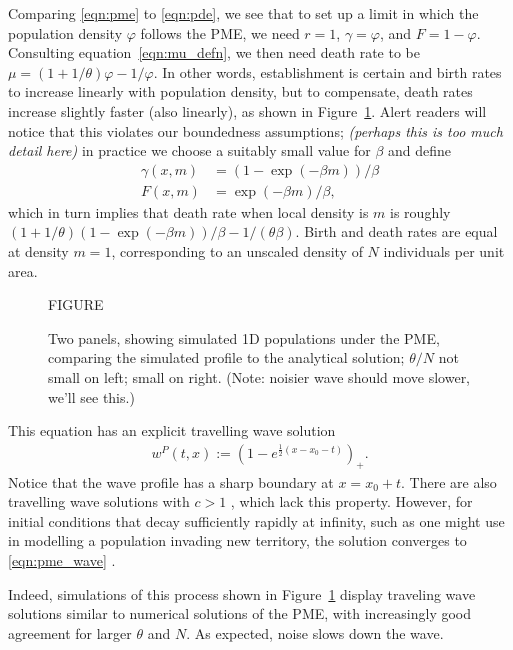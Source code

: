 \documentclass[12pt]{article}
\newcommand{\comment}[1]{{\color{blue} \it #1}}
\begin{document}
Comparing \eqref{eqn:pme} to \eqref{eqn:pde},
we see that to set up a limit in which the population density $\varphi$ follows the PME,
we need $r=1$,
$\gamma = \varphi$, and $F = 1 - \varphi$.
Consulting equation~\eqref{eqn:mu_defn},
we then need death rate to be $\mu = (1 + 1/\theta) \varphi - 1/\varphi$.
In other words,
establishment is certain
and birth rates to increase linearly with population density,
but to compensate, death rates increase slightly faster (also linearly),
as shown in Figure~\ref{fig:pme_waves}.
Alert readers will notice that this violates our boundedness assumptions;
\comment{(perhaps this is too much detail here)}
in practice we choose a suitably small value for $\beta$ and define
\begin{align*}
    \gamma(x, m) &= (1 - \exp(- \beta m)) / \beta \\
    F(x, m) &= \exp(- \beta m) / \beta ,
\end{align*}
which in turn implies that death rate when local density is $m$
is roughly $(1 + 1/\theta) (1 - \exp(-\beta m)) / \beta - 1/(\theta \beta)$.
Birth and death rates are equal at density $m = 1$,
corresponding to an unscaled density of $N$ individuals per unit area.

\begin{figure}
    \begin{center}
        FIGURE
    \end{center}
    \caption{
        Two panels, showing simulated 1D populations under the PME, comparing the simulated
        profile to the analytical solution;
        $\theta/N$ not small on left; small on right.
        (Note: noisier wave should move slower, we'll see this.)
        \label{fig:pme_waves}
    }
\end{figure}

This equation has an explicit travelling wave solution
\begin{align} \label{eqn:pme_wave}
    w^P(t, x)
    :=
    \left( 1 - e^{ \frac{1}{2} (x - x_0 - t) } \right)_+ .
\end{align}
Notice that the wave profile has a sharp boundary at $x = x_0 + t$.
There are also travelling wave solutions with $c>1$ \citep{gilding/kersner:2005},
which lack this property.
However, for initial conditions that decay sufficiently rapidly at infinity,
such as one might use in modelling a population invading new territory,
the solution converges to \eqref{eqn:pme_wave} \citep{kamin/rosenau:2004}.

Indeed, simulations of this process
shown in Figure~\ref{fig:pme_waves}
display traveling wave solutions
similar to numerical solutions of the PME,
with increasingly good agreement for larger $\theta$ and $N$.
As expected, noise slows down the wave.
\end{document}
